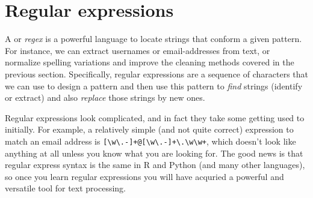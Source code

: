 \section{Regular expressions}
\label{sec:regular}

A  or \emph{regex} is a powerful language to locate strings that conform a given pattern. For instance, we can extract usernames or email-addresses from text, or normalize spelling variations and improve the cleaning methods covered in the previous section. Specifically, regular expressions are a sequence of characters that we can use to design a pattern and then use this pattern to \emph{find} strings (identify or extract) and also \emph{replace} those strings by new ones. 

Regular expressions look complicated, and in fact they take some getting used to initially.
For example, a relatively simple (and not quite correct) expression to match an email address is \verb|[\w\.-]+@[\w\.-]+\.\w\w+|,
which doesn't look like anything at all unless you know what you are looking for.
The good news is that regular express syntax is the same in R and Python (and many other languages),
so once you learn regular expressions you will have acquried a powerful and versatile tool for text processing. 



